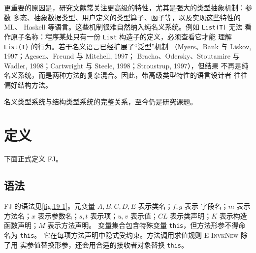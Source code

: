 更重要的原因是，研究文献常关注更高级的特性，尤其是强大的类型抽象机制：参数
多态、抽象数据类型、用户定义的类型算子、函子等，以及实现这些特性的 ML、
Haskell 等语言。这些机制很难自然纳入纯名义系统。例如 \texttt{List(T)} 无法
看作原子名称：程序某处只有一份 \texttt{List} 构造子的定义，必须查看它才能
理解 \texttt{List(T)} 的行为。若干名义语言已经扩展了“泛型”机制
（Myers、Bank 与 Liskov, 1997；Agesen、Freund 与 Mitchell, 1997；
Bracha、Odersky、Stoutamire 与 Wadler, 1998；Cartwright 与 Steele,
1998；Stroustrup, 1997），但结果
不再是纯名义系统，而是两种方法的复杂混合。因此，带高级类型特性的语言设计者
往往偏好结构方法。

名义类型系统与结构类型系统的完整关系，至今仍是研究课题。

\section{定义}
\label{sec:19.4}

下面正式定义 FJ。

\subsection*{语法}

FJ 的语法见\cref{fig:19-1}。元变量 \(A,B,C,D,E\) 表示类名；\(f,g\) 表示
字段名；\(m\) 表示方法名；\(x\) 表示参数名；\(s,t\) 表示项；\(u,v\)
表示值；\(CL\) 表示类声明；\(K\) 表示构造函数声明；\(M\) 表示方法声明。
变量集合包含特殊变量 \texttt{this}，但方法形参不得命名为 \texttt{this}。
它在每项方法声明中隐式受约束。方法调用求值规则 \textsc{E-InvkNew} 除了用
实参值替换形参，还会用合适的接收者对象替换 \texttt{this}。

